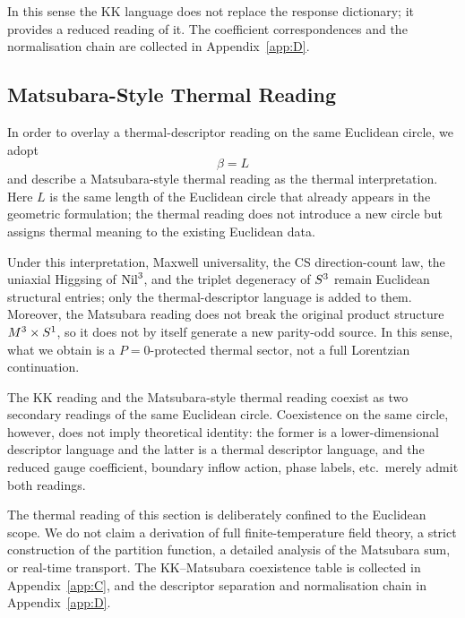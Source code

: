 In this sense the KK language does not replace the response dictionary; it
provides a reduced reading of it.  The coefficient correspondences and the
normalisation chain are collected in Appendix~\ref{app:D}.

\subsection{Matsubara-Style Thermal Reading}
\label{sec:circle:matsubara}

In order to overlay a thermal-descriptor reading on the same Euclidean
circle, we adopt
\begin{equation}
  \beta = L
\end{equation}
and describe a Matsubara-style thermal reading as the thermal interpretation.
Here $L$ is the same length of the Euclidean circle that already appears in
the geometric formulation; the thermal reading does not introduce a new
circle but assigns thermal meaning to the existing Euclidean data.

Under this interpretation, Maxwell universality, the CS direction-count law,
the uniaxial Higgsing of $\mathrm{Nil}^3$, and the triplet degeneracy of
$S^3$ remain Euclidean structural entries; only the thermal-descriptor
language is added to them.  Moreover, the Matsubara reading does not break
the original product structure $M^3\times S^1$, so it does not by itself
generate a new parity-odd source.  In this sense, what we obtain is a
$P=0$-protected thermal sector, not a full Lorentzian continuation.

The KK reading and the Matsubara-style thermal reading coexist as two
secondary readings of the same Euclidean circle.  Coexistence on the same
circle, however, does not imply theoretical identity: the former is a
lower-dimensional descriptor language and the latter is a thermal
descriptor language, and the reduced gauge coefficient, boundary inflow
action, phase labels, etc.\ merely admit both readings.

The thermal reading of this section is deliberately confined to the
Euclidean scope.  We do not claim a derivation of full finite-temperature
field theory, a strict construction of the partition function, a detailed
analysis of the Matsubara sum, or real-time transport.  The KK--Matsubara
coexistence table is collected in Appendix~\ref{app:C}, and the descriptor
separation and normalisation chain in Appendix~\ref{app:D}.
